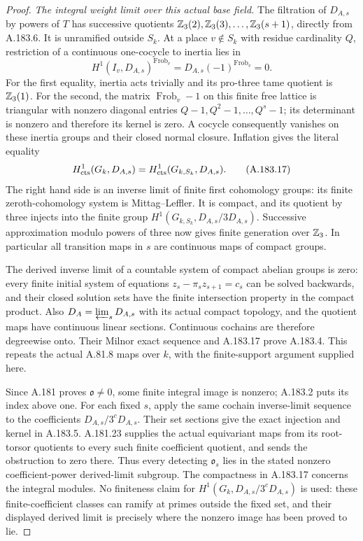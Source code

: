 \begin{proof}
\emph{The integral weight limit over this actual base field.}
The filtration of \(D_{A,s}\) by powers of \(T\) has successive
quotients
\(\mathbb Z_3(2),\mathbb Z_3(3),\ldots,\mathbb Z_3(s+1)\), directly from A.183.6.
It is unramified outside \(S_k\).  At a place \(v\notin S_k\)
with residue cardinality \(Q\), restriction of a continuous
one-cocycle to inertia lies in
\[
 H^1(I_v,D_{A,s})^{\operatorname{Frob}_v}
       =D_{A,s}(-1)^{\operatorname{Frob}_v}=0.
\tag{A.183.16}
\]
For the first equality, inertia acts trivially and its pro-three
tame quotient is \(\mathbb Z_3(1)\).  For the second, the matrix
\(\operatorname{Frob}_v-1\) on this finite free lattice is
triangular with nonzero diagonal entries
\(Q-1,Q^2-1,\ldots,Q^s-1\); its determinant is nonzero and
therefore its kernel is zero.  A cocycle consequently vanishes
on these inertia groups and their closed normal closure.
Inflation gives the literal equality
\[
 H^1_{\rm cts}(G_k,D_{A,s})
       =H^1_{\rm cts}(G_{k,S_k},D_{A,s}).
\tag{A.183.17}
\]
The right hand side is an inverse limit of finite first
cohomology groups: its finite zeroth-cohomology system is
Mittag--Leffler.  It is compact, and its quotient by three
injects into the finite group
\(H^1(G_{k,S_k},D_{A,s}/3D_{A,s})\).
Successive approximation modulo powers of three now gives
finite generation over \(\mathbb Z_3\).  In particular all transition
maps in \(s\) are continuous maps of compact groups.

The derived inverse limit of a countable system of compact
abelian groups is zero: every finite initial system of equations
\(z_s-\pi_s z_{s+1}=c_s\) can be solved backwards, and their
closed solution sets have the finite intersection property in
the compact product.  Also \(D_A=\varprojlim_sD_{A,s}\) with
its actual compact topology, and the quotient maps have
continuous linear sections.  Continuous cochains are therefore
degreewise onto.  Their Milnor exact sequence and A.183.17
prove A.183.4.  This repeats the actual A.81.8 maps over
\(k\), with the finite-support argument supplied here.

Since A.181 proves \(\mathfrak o\ne0\), some finite integral
image is nonzero; A.183.2 puts its index above one.
For each fixed \(s\), apply the same cochain inverse-limit
sequence to the coefficients \(D_{A,s}/3^cD_{A,s}\).
Their set sections give the exact injection and kernel in
A.183.5.  A.181.23 supplies the actual equivariant maps from
its root-torsor quotients to every such finite coefficient
quotient, and sends the obstruction to zero there.
Thus every detecting \(\mathfrak o_s\) lies in the stated
nonzero coefficient-power derived-limit subgroup.
The compactness in A.183.17 concerns the integral modules.
No finiteness claim for \(H^1(G_k,D_{A,s}/3^cD_{A,s})\) is
used: these finite-coefficient classes can ramify at primes
outside the fixed set, and their displayed derived limit is
precisely where the nonzero image has been proved to lie.


\end{proof}

